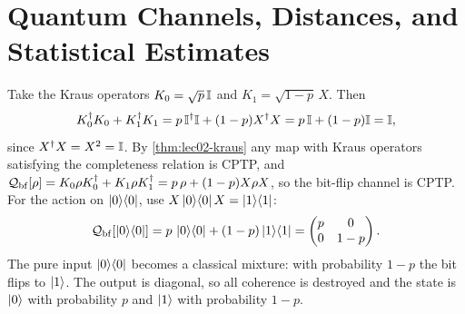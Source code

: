 \chapter{Quantum Channels, Distances, and Statistical Estimates}

\begin{solution}
Take the Kraus operators $K_0=\sqrt{p}\,\mathbb{I}$ and $K_1=\sqrt{1-p}\,X$. Then
\[
  K_0^{\dagger} K_0+K_1^{\dagger} K_1=p\,\mathbb{I}^{\dagger}\mathbb{I}+(1-p)X^{\dagger} X=p\,\mathbb{I}+(1-p)\mathbb{I}=\mathbb{I},
\]
since $X^{\dagger} X=X^{2}=\mathbb{I}$. By \cref{thm:lec02-kraus} any map with Kraus operators
satisfying the completeness relation is CPTP, and
$\mathcal{Q}_{\mathrm{bf}}[\rho]=K_0\rho K_0^{\dagger}+K_1\rho K_1^{\dagger}=p\,\rho+(1-p)X\rho X$,
so the bit-flip channel is CPTP. For the action on $\ket{0}\!\bra{0}$, use
$X\ket{0}\!\bra{0}X=\ket{1}\!\bra{1}$:
\[
  \mathcal{Q}_{\mathrm{bf}}[\ket{0}\!\bra{0}]=p\,\ket{0}\!\bra{0}+(1-p)\ket{1}\!\bra{1}
   =\begin{pmatrix}p&0\\0&1-p\end{pmatrix}.
\]
The pure input $\ket{0}\!\bra{0}$ becomes a classical mixture: with probability $1-p$ the
bit flips to $\ket{1}$. The output is diagonal, so all coherence is destroyed and
the state is $\ket{0}$ with probability $p$ and $\ket{1}$ with probability $1-p$.
\end{solution}

